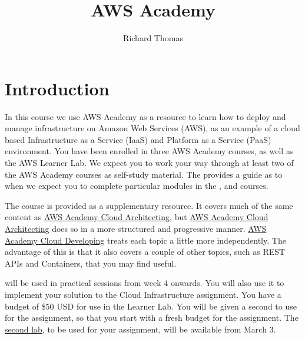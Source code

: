 \title{AWS Academy}
\author{Richard Thomas}
\date{}

\maketitle

\section{Introduction}
In this course we use AWS Academy as a resource to learn how to deploy and manage infrastructure on Amazon Web Services (AWS),
as an example of a cloud based Infrastructure as a Service (IaaS) and Platform as a Service (PaaS) environment.
You have been enrolled in three AWS Academy courses, as well as the AWS Learner Lab.
We expect you to work your way through at least two of the AWS Academy courses as self-study material.
The  provides a guide as to when we expect you to complete particular modules in the
,
and  courses.

The 
course is provided as a supplementary resource.
It covers much of the same content as
\href{https://awsacademy.instructure.com/courses/110993}{AWS Academy Cloud Architecting}, 
but \href{https://awsacademy.instructure.com/courses/110993}{AWS Academy Cloud Architecting}
does so in a more structured and progressive manner.
\href{https://awsacademy.instructure.com/courses/110994}{AWS Academy Cloud Developing}
treats each topic a little more independently.
The advantage of this is that it also covers a couple of other topics,
such as REST APIs and Containers, that you may find useful.

will be used in practical sessions from week 4 onwards.
You will also use it to implement your solution to the Cloud Infrastructure assignment.
You have a budget of \$50 USD for use in the Learner Lab.
You will be given a second 
to use for the assignment,
so that you start with a fresh budget for the assignment.
The \href{https://awsacademy.instructure.com/courses/112082}{second lab},
to be used for your assignment, will be available from March 3.

